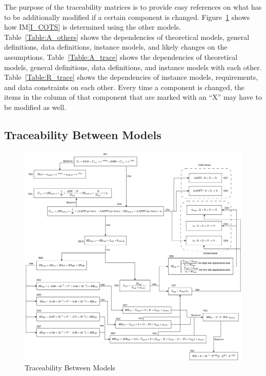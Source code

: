 \documentclass[12pt]{article}
\newcommand{\iref}[1]{IM\ref{#1}}
\begin{document}
The purpose of the traceability matrices is to provide easy references on what
has to be additionally modified if a certain component is changed.  Figure~\ref{Fig_TraceabilityBetweenModels} shows how \iref{I_COTS} is determined using the other models.
\\
Table~\ref{Table:A_others} shows the dependencies of theoretical models, general definitions, data definitions, instance models, and likely changes on the assumptions. Table~\ref{Table:A_trace} shows the dependencies of theoretical models, general definitions, data definitions, and instance models with each other. Table~\ref{Table:R_trace} shows the dependencies of instance models, requirements, and data constraints on each other. Every time a component is changed, the items in the column of that component that are marked
with an ``X'' may have to be modified as well. 

\subsection{Traceability Between Models}

\begin{figure}[h!]
\begin{center}
 \includegraphics[width=\textwidth]{TraceabilityBetweenModels}
\caption{Traceability Between Models}
\label{Fig_TraceabilityBetweenModels} 
\end{center}
\end{figure}
\end{document}
